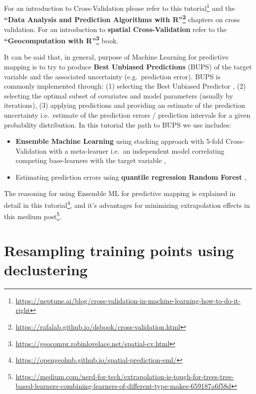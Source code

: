 \documentclass[
  graybox,natbib,nospthms]{svmono}
\providecommand{\tightlist}{%
  \setlength{\itemsep}{0pt}\setlength{\parskip}{0pt}}
\providecommand{\tightlist}{\setlength{\itemsep}{0pt}\setlength{\parskip}{0pt}}
\renewcommand{\href}[2]{#2 (\url{#1})}
\renewcommand{\href}[2]{#2\footnote{\url{#1}}}
\begin{document}
For an introduction to Cross-Validation please refer to \href{https://neptune.ai/blog/cross-validation-in-machine-learning-how-to-do-it-right}{this tutorial}
and the \textbf{\href{https://rafalab.github.io/dsbook/cross-validation.html}{``Data Analysis and Prediction Algorithms with R''}} chapters on cross validation.
For an introduction to \textbf{spatial Cross-Validation} refer to the \textbf{\href{https://geocompr.robinlovelace.net/spatial-cv.html}{``Geocomputation with R''}} book.

It can be said that, in general, purpose of Machine Learning for predictive
mapping is to try to produce \textbf{Best Unbiased Predictions} (BUPS) of the target
variable and the associated uncertainty (e.g.~prediction error).
BUPS is commonly implemented through: (1) selecting the Best Unbiased Predictor
\citep{Venables2002Springer}, (2) selecting the optimal subset of covariates and model
parameters (usually by iterations), (3) applying predictions and providing an
estimate of the prediction uncertainty i.e.~estimate of the prediction errors /
prediction intervals for a given probability distribution. In this tutorial the
path to BUPS we use includes:

\begin{itemize}
\tightlist
\item
  \textbf{Ensemble Machine Learning} using stacking approach with 5-fold Cross-Validation
  with a meta-learner i.e.~an independent model correlating competing base-learners
  with the target variable \citep{polley2010super, bischl2016mlr},
\item
  Estimating prediction errors using \textbf{quantile regression Random Forest} \citep{lu2021unified},
\end{itemize}

The reasoning for using Ensemble ML for predictive mapping is explained in detail
in \href{https://opengeohub.github.io/spatial-prediction-eml/}{this tutorial}, and it's
advantages for minimizing extrapolation effects in this \href{https://medium.com/nerd-for-tech/extrapolation-is-tough-for-trees-tree-based-learners-combining-learners-of-different-type-makes-659187a6f58d}{medium post}.

\hypertarget{resampling-training-points-using-declustering}{%
\section{Resampling training points using declustering}\label{resampling-training-points-using-declustering}}
\end{document}
